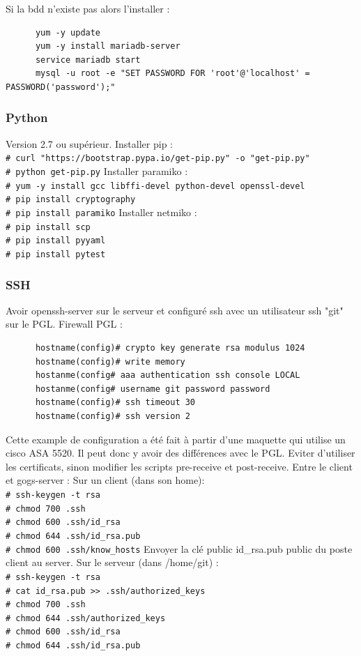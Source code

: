 \documentclass{article}
\newcommand{\shellcmdd}[1]{\\\indent\indent\texttt{\footnotesize\# #1}}
\begin{document}
      \noindent Si la bdd n'existe pas alors l'installer :
\begin{verbatim}
      yum -y update
      yum -y install mariadb-server
      service mariadb start
      mysql -u root -e "SET PASSWORD FOR 'root'@'localhost' = PASSWORD('password');"
\end{verbatim}

      \subsubsection{Python}

      \noindent Version 2.7 ou supérieur. \bigbreak
      \noindent Installer pip :
      \noindent\shellcmdd{curl "https://bootstrap.pypa.io/get-pip.py" -o "get-pip.py"}
      \noindent\shellcmdd{python get-pip.py} \smallbreak
      \noindent Installer paramiko :
      \noindent\shellcmdd{yum -y install gcc libffi-devel python-devel openssl-devel}
      \noindent\shellcmdd{pip install cryptography}
      \noindent\shellcmdd{pip install paramiko} \smallbreak
      \noindent Installer netmiko :
      \noindent\shellcmdd{pip install scp}
      \noindent\shellcmdd{pip install pyyaml}
      \noindent\shellcmdd{pip install pytest}

    \subsubsection{SSH}

      \noindent Avoir openssh-server sur le serveur et configuré ssh avec un utilisateur ssh "git" sur le PGL. \bigbreak
      \noindent Firewall PGL : \smallbreak
\begin{verbatim}
      hostname(config)# crypto key generate rsa modulus 1024
      hostname(config)# write memory
      hostanme(config# aaa authentication ssh console LOCAL
      hostanme(config# username git password password
      hostname(config)# ssh timeout 30
      hostname(config)# ssh version 2
\end{verbatim}
      \noindent Cette example de configuration a été fait à partir d'une maquette qui utilise un cisco ASA 5520.
      Il peut donc y avoir des différences avec le PGL. Eviter d'utiliser les certificats, sinon modifier les scripts
      pre-receive et post-receive.
      \noindent Entre le client et gogs-server : \bigbreak
      Sur un client (dans son home):
      \shellcmdd{ssh-keygen -t rsa}
      \shellcmdd{chmod 700 .ssh}
      \shellcmdd{chmod 600 .ssh/id\_rsa}
      \shellcmdd{chmod 644 .ssh/id\_rsa.pub}
      \shellcmdd{chmod 600 .ssh/know\_hosts} \smallbreak
      Envoyer la clé public id\_rsa.pub public du poste client au server. \bigbreak
      Sur le serveur (dans /home/git) :
      \shellcmdd{ssh-keygen -t rsa}
      \shellcmdd{cat id\_rsa.pub >> .ssh/authorized\_keys}
      \shellcmdd{chmod 700 .ssh}
      \shellcmdd{chmod 644 .ssh/authorized\_keys}
      \shellcmdd{chmod 600 .ssh/id\_rsa}
      \shellcmdd{chmod 644 .ssh/id\_rsa.pub} \smallbreak
\end{document}
